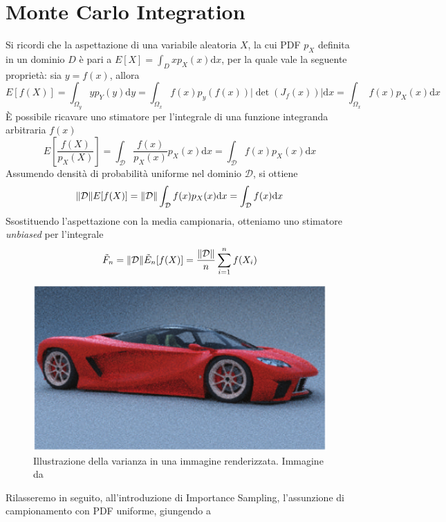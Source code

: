 \section{Monte Carlo Integration}
Si ricordi che la aspettazione di una variabile aleatoria $X$, la cui PDF $p_X$ definita in un dominio $D$ \`e pari a 
\mbox{$E[X]=\int_Dxp_X(x)\mathrm{d}x$}, per la quale vale la seguente propriet\`a: sia $y=f(x)$, allora
\begin{equation*}
	E[f(X)]=\int_{\Omega_y}yp_Y(y)\mathrm{d}y=\int_{\Omega_x}f(x)p_y(f(x))\left|\det(J_f(x))\right|\mathrm{d}x=\int_{\Omega_x}f(x)p_X(x)\mathrm{d}x
\end{equation*}
\`E possibile ricavare uno stimatore per l'integrale di una funzione integranda arbitraria $f(x)$
\begin{equation}
	E\left[\frac{f(X)}{p_X(X)}\right]=\int_{\mathcal{D}}\frac{f(x)}{p_X(x)}p_X(x)\mathrm{d}x=\int_{\mathcal{D}}f(x)p_X(x)\mathrm{d}x
\end{equation}
Assumendo densit\`a di probabilit\`a uniforme nel dominio $\mathcal{D}$, si ottiene
\begin{equation}
	\norm{\mathcal{D}}E[f(X)]=\norm{\mathcal{D}}\int_{\mathcal{D}}f(x)p_X(x)\mathrm{d}x=\int_{\mathcal{D}}f(x)\mathrm{d}x
\end{equation}
Ssostituendo l'aspettazione con la media campionaria, otteniamo uno stimatore \textit{unbiased}\footnotemark{} per l'integrale
\begin{equation}\label{chapter6:MC:crudeEstimator}
	\tilde{F}_n=\norm{\mathcal{D}}\tilde{E}_n[f(X)]=\frac{\norm{\mathcal{D}}}{n}\sum_{i=1}^nf(X_i)
\end{equation}
\begin{figure}[tb]
	\centering
	\includegraphics[width=0.7\linewidth]{../assets/chapter6_MC_variance.png}
	\caption{Illustrazione della varianza in una immagine renderizzata. Immagine da \cite{pharr}}
	\label{chapter6:MC:variance}
\end{figure}
Rilasseremo in seguito, all'introduzione di Importance Sampling, l'assunzione di campionamento con PDF uniforme, giungendo a
